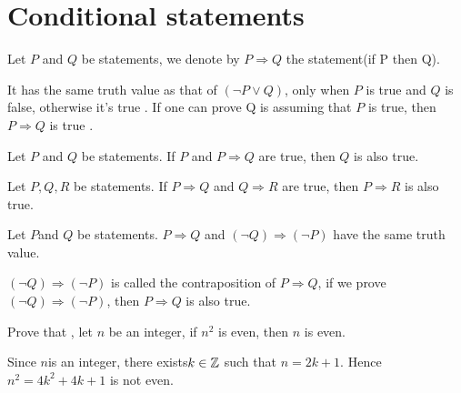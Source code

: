 \documentclass{book}
\numberwithin{equation}{section}
\begin{document}
\section{Conditional statements}
\begin{definitionenv}
    Let $P$ and $Q$ be statements, we denote by $P\Rightarrow Q$ the statement(if P then Q).
\end{definitionenv}
\begin{remark}
    It has the same truth value as that of $(\neg P\vee Q)$, only when $P$ is true and $Q$ is false,  otherwise it's true .
    \newline
    If one can prove Q is assuming that $P$ is true,  then $P\Rightarrow Q$ is true .
\end{remark}
\begin{propositionenv}
    Let $P$ and $Q$ be statements. If $P$ and $P\Rightarrow Q$ are true,  then $Q$ is also true.
\end{propositionenv}
\begin{propositionenv}
    Let $P, Q, R$ be statements. If $P \Rightarrow Q$ and $Q\Rightarrow R$ are true,  then $P\Rightarrow R$ is also true.
\end{propositionenv}
\begin{theoremenv}
    Let $P$and $Q$ be statements. $P\Rightarrow Q$ and $(\neg Q)\Rightarrow (\neg P)$ have the same truth value.
\end{theoremenv}
\begin{box2}
    $(\neg Q)\Rightarrow (\neg P)$ is called the contraposition of $P\Rightarrow Q$,  if we prove $(\neg Q)\Rightarrow (\neg P)$,  then $P\Rightarrow Q$ is also true.
\end{box2}

\begin{exampleenv}
    Prove that , let $n$ be an integer,  if $n^2$ is even,  then $n$ is even.
\end{exampleenv}    
    \begin{proofenv}
        Since $n$is an integer,  there exists$k\in \mathbb{Z}$ such that $n=2k+1$. Hence $n^2=4k^2+4k+1$ is not even.
    \end{proofenv}
\end{document}
